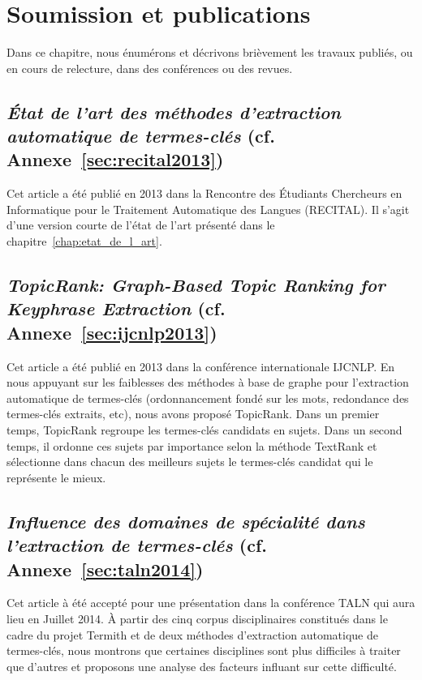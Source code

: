 \chapter{Soumission et publications}
  Dans ce chapitre, nous énumérons et décrivons brièvement les travaux
  publiés, ou en cours de relecture, dans des conférences ou des revues.

  \section{\textit{État de l'art des méthodes d'extraction automatique de
           termes-clés} (cf. Annexe~\ref{sec:recital2013})}
    Cet article a été publié en 2013 dans la Rencontre des Étudiants Chercheurs
    en Informatique pour le Traitement Automatique des Langues (RECITAL). Il
    s'agit d'une version courte de l'état de l'art présenté dans le
    chapitre~\ref{chap:etat_de_l_art}.

  \section{\textit{TopicRank: Graph-Based Topic Ranking for Keyphrase
           Extraction} (cf. Annexe~\ref{sec:ijcnlp2013})}
  \label{sec:resume_ijcnlp2013}
    Cet article a été publié en 2013 dans la conférence internationale IJCNLP.
    En nous appuyant sur les faiblesses des méthodes à base de graphe pour
    l'extraction automatique de termes-clés (ordonnancement fondé sur les mots,
    redondance des termes-clés extraits, etc), nous avons proposé TopicRank.
    Dans un premier temps, TopicRank regroupe les termes-clés candidats en
    sujets. Dans un second temps, il ordonne ces sujets par importance selon la
    méthode TextRank et sélectionne dans chacun des meilleurs sujets le
    termes-clés candidat qui le représente le mieux.

  \section{\textit{Influence des domaines de spécialité dans l'extraction de
           termes-clés} (cf. Annexe~\ref{sec:taln2014})}
    Cet article à été accepté pour une présentation dans la conférence TALN qui
    aura lieu en Juillet 2014. À partir des cinq corpus disciplinaires
    constitués dans le cadre du projet Termith et de deux méthodes d'extraction
    automatique de termes-clés, nous montrons que certaines disciplines sont
    plus difficiles à traiter que d'autres et proposons une analyse des facteurs
    influant sur cette difficulté.

